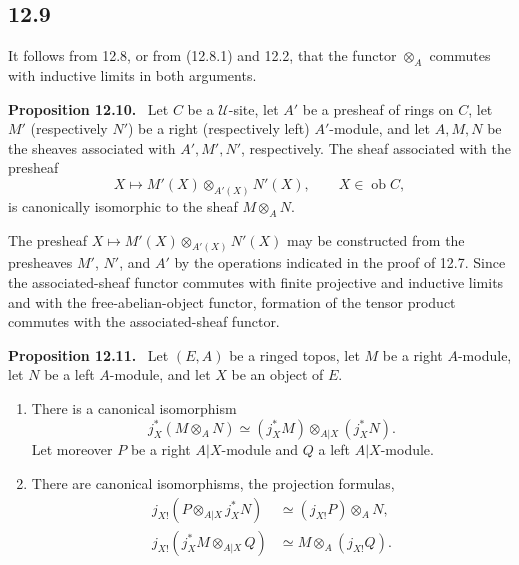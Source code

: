 \documentclass[11pt]{article}
\newcommand{\U}{\mathcal{U}}
\newcommand{\ob}{\operatorname{ob}}
\newenvironment{statement}[1]{\par\medskip\noindent\textbf{#1.}\ }{\par\medskip}
\begin{document}
\subsection*{12.9}
It follows from 12.8, or from (12.8.1) and 12.2, that the functor $\otimes_A$ commutes with inductive limits in both arguments.

\begin{statement}{Proposition 12.10}
Let $C$ be a $\U$-site, let $A'$ be a presheaf of rings on $C$, let $M'$ (respectively $N'$) be a right (respectively left) $A'$-module, and let $A,M,N$ be the sheaves associated with $A',M',N'$, respectively. The sheaf associated with the presheaf
\[
X\longmapsto M'(X)\otimes_{A'(X)}N'(X),\qquad X\in\ob C,
\]
is canonically isomorphic to the sheaf $M\otimes_A N$.
\end{statement}

The presheaf $X\mapsto M'(X)\otimes_{A'(X)}N'(X)$ may be constructed from the presheaves $M'$, $N'$, and $A'$ by the operations indicated in the proof of 12.7. Since the associated-sheaf functor commutes with finite projective and inductive limits and with the free-abelian-object functor, formation of the tensor product commutes with the associated-sheaf functor.

\begin{statement}{Proposition 12.11}
Let $(E,A)$ be a ringed topos, let $M$ be a right $A$-module, let $N$ be a left $A$-module, and let $X$ be an object of $E$.
\begin{enumerate}[label=\alph*)]
\item There is a canonical isomorphism
\[
j_X^*(M\otimes_A N)\simeq (j_X^*M)\otimes_{A|X}(j_X^*N).
\]
Let moreover $P$ be a right $A|X$-module and $Q$ a left $A|X$-module.
\item There are canonical isomorphisms, the projection formulas,
\begin{align*}
j_{X!}(P\otimes_{A|X}j_X^*N)&\simeq (j_{X!}P)\otimes_A N,\\
j_{X!}(j_X^*M\otimes_{A|X}Q)&\simeq M\otimes_A(j_{X!}Q).
\end{align*}
\end{enumerate}
\end{statement}
\end{document}
